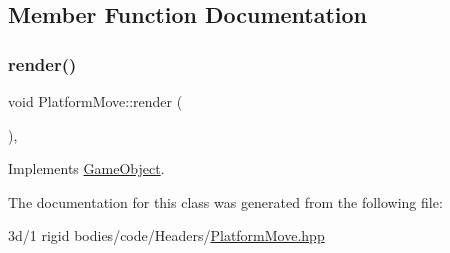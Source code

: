 \subsection{Member Function Documentation}
\mbox{\label{class_platform_move_ac8e703c3529c602c9f0cc0a4148bcc34}} 
\subsubsection{\texorpdfstring{render()}{render()}}
{\footnotesize\ttfamily void Platform\+Move\+::render (\begin{DoxyParamCaption}{ }\end{DoxyParamCaption})\hspace{0.3cm}{\ttfamily [override]}, {\ttfamily [virtual]}}



Implements \mbox{\hyperlink{class_game_object_adee58d508cfa907162d1192a25dc21b9}{Game\+Object}}.



The documentation for this class was generated from the following file\+:\begin{DoxyCompactItemize}
\item 
3d/1 rigid bodies/code/\+Headers/\mbox{\hyperlink{_platform_move_8hpp}{Platform\+Move.\+hpp}}\end{DoxyCompactItemize}
